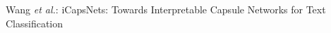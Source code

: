 \documentclass[10pt,journal,compsoc]{IEEEtran}
\begin{document}
%
%



%
{Wang \MakeLowercase{\textit{et al.}}: iCapsNets: Towards Interpretable Capsule Networks for Text Classification}
%



\end{document}
